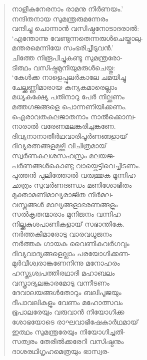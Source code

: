 \begin{verse}
നാളീകനേരനാം രാമനു നിര്‍ണയം.’\\
നന്ദിതനായ സുമന്ത്രരുമന്നേരം\\
വന്ദിച്ചു ചൊന്നാന്‍ വസിഷ്ഠനോടാദരാല്‍:\\
‘എന്തോന്നു വേണ്ടുന്നതെന്നരുള്‍ചെയ്താലു-\\
മന്തരമെന്നിയേ സംഭരിച്ചീടുവന്‍.’\\
ചിത്തേ നിരൂപിച്ചുകണ്ടു സുമന്ത്രരോ-\\
ടിത്ഥം വസിഷ്ഠമുനിയുമരുള്‍ചെയ്തു:\\
‘കേള്‍ക്ക നാളെപ്പുലര്‍കാലേ ചമയിച്ചു\\
ചേല്ക്കണ്ണിമാരായ കന്യകമാരെല്ലാം\\
മധ്യകക്ഷ്യേ പതിനാറു പേര്‍ നില്ക്കണം\\
മത്തഗജങ്ങളെ പൊന്നണിയിക്കണം.\\
ഐരാവതകുലജാതനാം നാല്‍ക്കൊമ്പ-\\
നാരാല്‍ വരേണമലങ്കരിച്ചങ്കണേ.\\
ദിവ്യനാനാതീര്‍ഥവാരിപൂര്‍ണങ്ങളായ്\\
ദിവ്യരത്നങ്ങളമഴ്ത്തി വിചിത്രമായ്\\
സ്വര്‍ണകലശസഹസ്രം മലയജ-\\
പര്‍ണങ്ങള്‍കൊണ്ടു വായ്കെട്ടിവെച്ചീടണം.\\
പുത്തന്‍ പുലിത്തോല്‍ വരുത്തുക മൂന്നിഹ\\
ഛത്രം സുവര്‍ണദണ്ഡം മണിശോഭിതം\\
മുക്താമണിമാല്യരാജിത നിര്‍മല-\\
വസ്ത്രങ്ങള്‍ മാല്യങ്ങളാഭരണങ്ങളും\\
സല്‍കൃതന്മാരാം മുനിജനം വന്നിഹ\\
നില്ക്കകുശപാണികളായ് സഭാന്തികേ.\\
നര്‍ത്തകിമാരോടു വാരവധൂജനം\\
നര്‍ത്തക ഗായക വൈണികവര്‍ഗവും\\
ദിവ്യവാദ്യങ്ങളെല്ലാം പരയോഗിക്കണ-\\
മുര്‍വീശ്വരാങ്കണേനിന്നു മനോഹരം\\
ഹസ്ത്യശ്വപത്തിരഥാദി മഹാബലം\\
വസ്ത്രാദ്യലങ്കാരമോടു വന്നീടണം\\
ദേവാലയങ്ങള്‍തോറും ബലിപൂജയും\\
ദീപാവലികളും വേണം മഹോത്സവം\\
ഭൂപാലരേയും വരുവാന്‍ നിയോഗിക്ക\\
ശോഭയോടെ രാഘവാഭിഷേകാര്‍ഥമായ്\\
ഇത്ഥം സുമന്ത്രരേയും നിയോഗിച്ചതി-\\
സത്വരം തേരില്‍ക്കരേറി വസിഷ്ഠനും\\
ദാശരഥിഗൃഹമെത്രയും ഭാസ്വര-\\

\end{verse}
